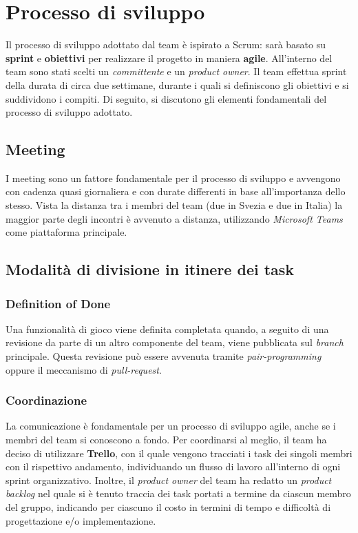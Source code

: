 \newpage
\section{Processo di sviluppo}
\label{sec:development}
Il processo di sviluppo adottato dal team è ispirato a Scrum: sarà basato su \textbf{sprint} e \textbf{obiettivi}
per realizzare il progetto in maniera \textbf{agile}.
All'interno del team sono stati scelti un \textit{committente} e un \textit{product owner}.
Il team effettua sprint della durata di circa due settimane, durante i quali si definiscono gli obiettivi e si suddividono i compiti.
Di seguito, si discutono gli elementi fondamentali del processo di sviluppo adottato.

\subsection{Meeting}
I meeting sono un fattore fondamentale per il processo di sviluppo e avvengono con cadenza quasi giornaliera
e con durate differenti in base all'importanza dello stesso. Vista la distanza tra i membri del
team (due in Svezia e due in Italia) la maggior parte degli incontri è avvenuto a distanza,
utilizzando \textit{Microsoft Teams} come piattaforma principale.

\subsection{Modalità di divisione in itinere dei task}

\subsubsection{Definition of Done}
Una funzionalità di gioco viene definita completata quando, a seguito di una revisione da parte
di un altro componente del team, viene pubblicata sul \textit{branch} principale. Questa revisione può essere avvenuta
tramite \textit{pair-programming} oppure il meccanismo di \textit{pull-request}.

\subsubsection{Coordinazione}
La comunicazione è fondamentale per un processo di sviluppo agile, anche se i membri del team si conoscono a fondo.
Per coordinarsi al meglio, il team ha deciso di utilizzare \textbf{Trello},
con il quale vengono tracciati i task dei singoli membri con il rispettivo andamento,
individuando un flusso di lavoro all'interno di ogni sprint organizzativo.
Inoltre, il \textit{product owner} del team ha redatto un \textit{product backlog} nel
quale si è tenuto traccia dei task portati a termine da ciascun membro del gruppo, indicando
per ciascuno il costo in termini di tempo e difficoltà di progettazione e/o implementazione.

